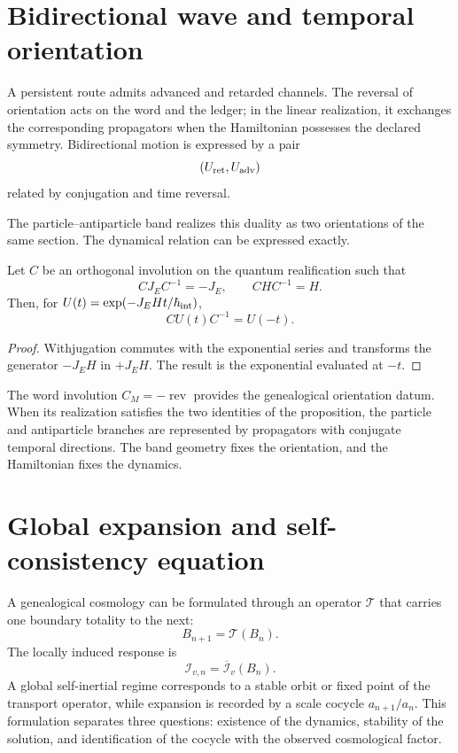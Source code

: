 \section{Bidirectional wave and temporal orientation}

A persistent route admits advanced and retarded channels. The reversal
of orientation acts on the word and the ledger; in the linear realization,
it exchanges the corresponding propagators when the Hamiltonian possesses the
declared symmetry. Bidirectional motion is expressed by a pair
\[
 (U_{\rm ret},U_{\rm adv})
\]
related by conjugation and time reversal.

The particle--antiparticle band realizes this duality as two orientations
of the same section. The dynamical relation can be expressed exactly.

\begin{proposition}
Let \(C\) be an orthogonal involution on the quantum realification such that
\[
 C J_E C^{-1}=-J_E,
 \qquad
 C H C^{-1}=H.
\]
Then, for
\(U(t)=\exp(-J_EHt/\hbar_{\rm int})\),
\[
 C U(t)C^{-1}=U(-t).
\]
\end{proposition}

\begin{proof}
Withjugation commutes with the exponential series and transforms the generator
\(-J_EH\) in \(+J_EH\). The result is the exponential evaluated at
\(-t\).
\end{proof}

The word involution \(C_M=-\operatorname{rev}\) provides the genealogical
orientation datum. When its realization satisfies the two identities of the
proposition, the particle and antiparticle branches are represented by
propagators with conjugate temporal directions. The band geometry fixes the
orientation, and the Hamiltonian fixes the dynamics.

\section{Global expansion and self-consistency equation}

A genealogical cosmology can be formulated through an operator
\(\mathcal T\) that carries one boundary totality to the next:
\[
 B_{n+1}=\mathcal T(B_n).
\]
The locally induced response is
\[
 \mathcal I_{v,n}=\overline{\mathcal I}_v(B_n).
\]
A global self-inertial regime corresponds to a stable orbit or fixed point
of the transport operator, while expansion is recorded by a
scale cocycle \(a_{n+1}/a_n\). This formulation separates three questions:
existence of the dynamics, stability of the solution, and identification of the
cocycle with the observed cosmological factor.

